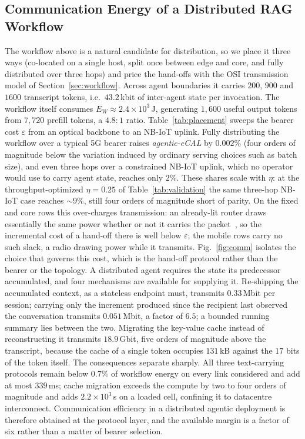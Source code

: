 \documentclass[journal]{IEEEtran}
\newif\ifshowchanges \showchangestrue
\newcommand{\NEW}{\ifshowchanges\color{blue}\fi}
\newcommand{\OLD}{\ifshowchanges\color{black}\fi}
\newcommand{\ROOF}{\ifshowchanges\color{green!45!black}\fi}
\newcommand{\caseEnergy}{\ensuremath{2.4\times10^{3}}}    %
\newcommand{\handoffBits}{$43.2$\,kbit}                 %
\newcommand{\agecal}{\textit{agentic-eCAL}}
\begin{document}
\subsection{Communication Energy of a Distributed RAG Workflow}  \NEW The workflow above is a natural candidate for
distribution, so we place it three ways (co-located on a single host, split once between edge and
core, and fully distributed over three hops) and price the hand-offs with the OSI transmission
model of Section~\ref{sec:workflow}. Across agent boundaries it carries $200$, $900$ and $1600$
transcript tokens, i.e.\ \handoffBits{} of inter-agent state per invocation. \NEW{}The workflow
itself consumes $E_W\approx\caseEnergy$\,J, generating $1{,}600$ useful output tokens from $7{,}720$
prefill tokens, a $4.8{:}1$ ratio.\OLD{} Table~\ref{tab:placement} sweeps the bearer cost $\varepsilon$ from an optical backbone to an NB-IoT uplink. Fully
distributing the workflow over a typical 5G bearer raises \agecal{} by $0.002\%$ (four orders of
magnitude below the variation induced by ordinary serving choices such as batch size), and even
three hops over a constrained NB-IoT uplink, which no operator would use to carry agent state,
reaches only $2\%$. \NEW{}These shares scale with $\eta$: at the throughput-optimized $\eta=0.25$ of
Table~\ref{tab:validation} the same three-hop NB-IoT case reaches $\sim\!9\%$, still four orders of
magnitude short of parity.\OLD{} \NEW{}On the fixed and core rows this over-charges transmission:
an already-lit router draws essentially the same power whether or not it carries the
packet~\cite{jacob2025routers}, so the incremental cost of a hand-off there is well below
$\varepsilon$; the mobile rows carry no such slack, a radio drawing power while it transmits.\OLD{}
\ROOF{}Fig.~\ref{fig:comm} isolates the choice that governs this cost, which is the
hand-off protocol rather than the bearer or the topology. A distributed agent requires the state
its predecessor accumulated, and four mechanisms are available for supplying it. Re-shipping the
accumulated context, as a stateless endpoint must, transmits $0.33$\,Mbit per session; carrying
only the increment produced since the recipient last observed the conversation transmits
$0.051$\,Mbit, a factor of $6.5$; a bounded running summary lies between the two. Migrating the
key-value cache instead of reconstructing it transmits $18.9$\,Gbit, five orders of magnitude
above the transcript, because the cache of a single token occupies $131$\,kB against the $17$ bits
of the token itself. The consequences separate sharply. All three text-carrying protocols remain
below $0.7\%$ of workflow energy on every link considered and add at most $339$\,ms; cache
migration exceeds the compute by two to four orders of magnitude and adds $2.2\times10^{3}$\,s on
a loaded cell, confining it to datacentre interconnect. Communication efficiency in a distributed
agentic deployment is therefore obtained at the protocol layer, and the available margin is a
factor of six rather than a matter of bearer selection.\OLD{}
\end{document}
